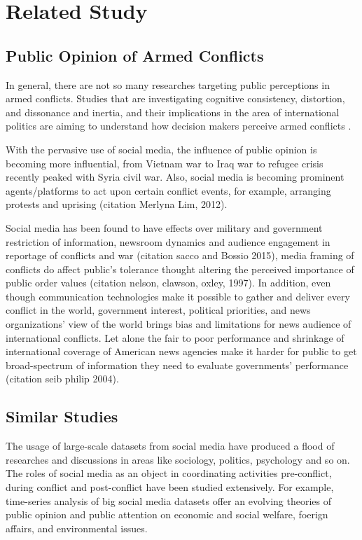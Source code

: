 \section{Related Study}
\subsection{Public Opinion of Armed Conflicts}
In general, there are not so many researches targeting public perceptions in armed conflicts. Studies that are investigating cognitive consistency, distortion, and dissonance and inertia, and their implications in the area of international politics are aiming to understand how decision makers perceive armed conflicts \cite{Jervis1976}.

With the pervasive use of social media, the influence of public opinion is becoming more influential, from Vietnam war to Iraq war to refugee crisis recently peaked with Syria civil war. Also, social media is becoming prominent agents/platforms to act upon certain conflict events, for example, arranging protests and uprising (citation Merlyna Lim, 2012).

Social media has been found to have effects over military and government restriction of information, newsroom dynamics and audience engagement in reportage of conflicts and war (citation sacco and Bossio 2015), media framing of conflicts do affect public's tolerance thought altering the perceived importance of public order values (citation nelson, clawson, oxley, 1997).  In addition, even though communication technologies make it possible to gather and deliver every conflict in the world, government interest, political priorities, and news organizations' view of the world brings bias and limitations for news audience of international conflicts. Let alone the fair to poor performance and shrinkage of international coverage of American news agencies make it harder for public to get broad-spectrum of information they need to evaluate governments’ performance (citation seib philip 2004).


\subsection{Similar Studies}
The usage of large-scale datasets from social media have produced a flood of researches and discussions in areas like sociology, politics, psychology and so on. The roles of social media as an object in coordinating activities pre-conflict, during conflict and post-conflict have been studied extensively. For example, time-series analysis of big social media datasets offer an evolving theories of public opinion and public attention on economic and social welfare, foerign affairs, and environmental issues. 


